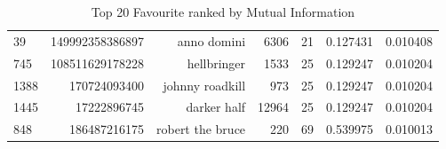 \begin{table}
\begin{tabular}{| >{\small}l | >{\small}r | >{\small}r | >{\small}r | >{\small}r | >{\small}r |>{\small}r |}
39   &  149992358386897 &          anno domini &      6306 &       21 &             0.127431 &            0.010408 \\
745  &  108511629178228 &          hellbringer &      1533 &       25 &             0.129247 &            0.010204 \\
1388 &     170724093400 &      johnny roadkill &       973 &       25 &             0.129247 &            0.010204 \\
1445 &      17222896745 &          darker half &     12964 &       25 &             0.129247 &            0.010204 \\
848  &     186487216175 &     robert the bruce &       220 &       69 &             0.539975 &            0.010013 \\
\hline
\end{tabular}
\caption{Top 20 Favourite ranked by Mutual Information}
\label {Top 20 Favourite ranked by Mutual Information}
\end{table}


